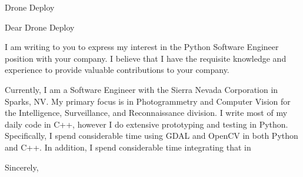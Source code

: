 \documentclass[12pt,sigleft]{letter}
\begin{document}
\begin{letter}{Drone Deploy}

\opening{Dear Drone Deploy}

I am writing to you to express my interest in the Python Software Engineer position with your company.  
I believe that I have the requisite knowledge and experience to provide valuable contributions to
your company.

Currently, I am a Software Engineer with the Sierra Nevada Corporation in Sparks, NV.  My primary focus 
is in Photogrammetry and Computer Vision for the Intelligence, Surveillance, and Reconnaissance division.  
I write most of my daily code in C++, however I do extensive prototyping and testing
in Python.  Specifically, I spend considerable time using GDAL and OpenCV in both Python and C++.
In addition, I spend considerable time integrating that in


\closing{Sincerely,}

\end{letter}
\end{document}

